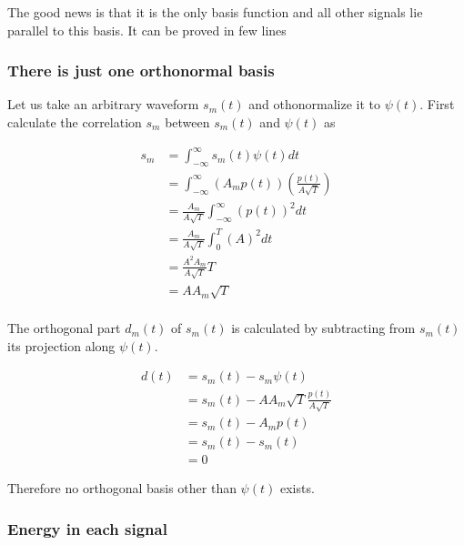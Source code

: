 \documentclass[a4paper]{article}
\numberwithin{equation}{subsection}
\begin{document}
	
	The good news is that it is the only basis function and all other signals lie parallel to this basis. It can be proved in few lines
	
	\subsubsection*{There is just one orthonormal basis}
	
	Let us take an arbitrary waveform $s_m(t)$ and othonormalize it to $\psi(t)$. First calculate the correlation $s_{m}$ between $s_m(t)$ and $\psi(t)$ as 
	
	\begin{equation}
	\begin{aligned}\label{eq:sm}
	s_{m}&=\int_{-\infty}^\infty s_m(t)\psi(t) dt \\
	&= \int_{-\infty}^\infty (A_m p(t) ) (\frac{p(t)}{A\sqrt{T}})\\
	&= \frac{A_m}{A\sqrt{T}} \int_{-\infty}^\infty (p(t))^2 dt \\
	&= \frac{A_m}{A\sqrt{T}} \int_0^T (A)^2 dt \\
	&= \frac{A^2 A_m}{A\sqrt{T}} T \\
	&= A A_m \sqrt{T} \\
	\end{aligned}
	\end{equation}
	
	The orthogonal part $d_m(t)$ of $s_m(t)$ is calculated by subtracting from $s_m(t)$ its projection along $\psi(t)$.
	
	\begin{equation}\label{key}
	\begin{aligned}
	d(t)&= s_m(t)-s_{m}\psi(t)\\
	&= s_m(t)-A A_m \sqrt{T} \frac{p(t)}{A\sqrt{T}}\\
	&= s_m(t)-A_m p(t) \\
	&= s_m(t)-s_m(t) \\
	&= 0
	\end{aligned}
	\end{equation}
	
	Therefore no orthogonal basis other than $\psi(t)$ exists.
	
	\subsubsection*{Energy in each signal}
	
\end{document}
